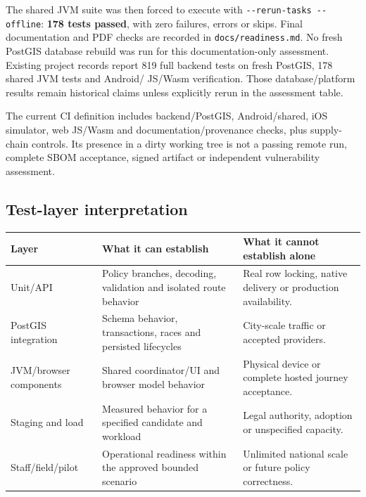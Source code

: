 \documentclass[11pt,a4paper]{article}
\newcommand{\src}[1]{{\small\nolinkurl{#1}}}
\begin{document}
The shared JVM suite was then forced to execute with \src{--rerun-tasks --offline}:
\textbf{178 tests passed}, with zero failures, errors or skips. Final documentation
and PDF checks are recorded in \src{docs/readiness.md}. No fresh PostGIS database
rebuild was run for this documentation-only assessment. Existing project records
report 819 full backend tests on fresh PostGIS, 178 shared JVM tests and Android/
JS/Wasm verification. Those database/platform results remain historical claims
unless explicitly rerun in the assessment table.

The current CI definition includes backend/PostGIS, Android/shared, iOS simulator,
web JS/Wasm and documentation/provenance checks, plus supply-chain controls. Its
presence in a dirty working tree is not a passing remote run, complete SBOM
acceptance, signed artifact or independent vulnerability assessment.

\subsection{Test-layer interpretation}
\begin{tabularx}{\textwidth}{@{}p{}XX@{}}
\toprule Layer & What it can establish & What it cannot establish alone \\\midrule
Unit/API & Policy branches, decoding, validation and isolated route behavior & Real row locking, native delivery or production availability. \\
PostGIS integration & Schema behavior, transactions, races and persisted lifecycles & City-scale traffic or accepted providers. \\
JVM/browser components & Shared coordinator/UI and browser model behavior & Physical device or complete hosted journey acceptance. \\
Staging and load & Measured behavior for a specified candidate and workload & Legal authority, adoption or unspecified capacity. \\
Staff/field/pilot & Operational readiness within the approved bounded scenario & Unlimited national scale or future policy correctness. \\
\bottomrule
\end{tabularx}

\clearpage
\end{document}

